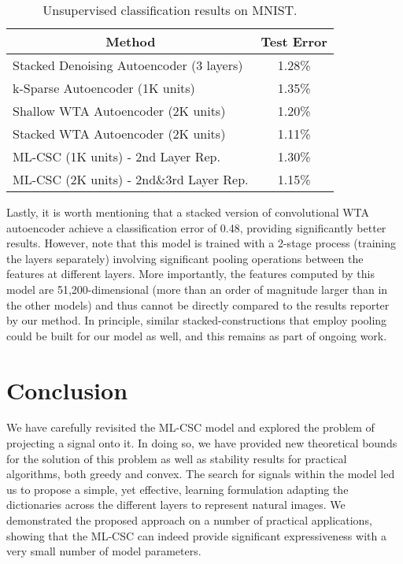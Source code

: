 \documentclass[10pt,journal]{IEEEtran}
\theoremstyle{plain}
\theoremstyle{definition}
\begin{document}
\begin{table}[]
		\centering \small
		\begin{tabular}{|l|c|}
		\hline 
		\multicolumn{1}{|c|}{\textbf{Method}} & \textbf{Test Error} \\ \hline
		Stacked Denoising Autoencoder (3 layers) \cite{vincent2010stacked} & 1.28\%                        \\ \hline
		k-Sparse Autoencoder (1K units) \cite{makhzani2013k}		  & 1.35\%                        \\ \hline
		Shallow WTA Autoencoder (2K units) \cite{makhzani2015winner}  & 1.20\%                        \\ \hline
		Stacked WTA Autoencoder (2K units)\cite{makhzani2015winner}   & 1.11\%                        \\ \hline
		ML-CSC (1K units) - 2nd Layer Rep.                   & 1.30\%                        \\ \hline
		ML-CSC (2K units) - 2nd\&3rd Layer Rep.              & 1.15\%                        \\ \hline 
		\end{tabular}
		\caption{Unsupervised classification results on MNIST.}
		\label{Table:UnsupervisedResults}
	\end{table}

Lastly, it is worth mentioning that a stacked version of convolutional WTA autoencoder \cite{makhzani2015winner} achieve a classification error of 0.48, providing significantly better results. However, note that this model is trained with a 2-stage process (training the layers separately) involving significant pooling operations between the features at different layers. More importantly, the features computed by this model are 51,200-dimensional (more than an order of magnitude larger than in the other models) and thus cannot be directly compared to the results reporter by our method. In principle, similar stacked-constructions that employ pooling could be built for our model as well, and this remains as part of ongoing work.
 
\section{Conclusion}
\label{sec:conclusions}

We have carefully revisited the ML-CSC model and explored the problem of projecting a signal onto it. In doing so, we have provided new theoretical bounds for the solution of this problem as well as stability results for practical algorithms, both greedy and convex. The search for signals within the model led us to propose a simple, yet effective, learning formulation adapting the dictionaries across the different layers to represent natural images. %
We demonstrated the proposed approach on a number of practical applications, showing that the ML-CSC can indeed provide significant expressiveness with a very small number of model parameters. 
\end{document}
